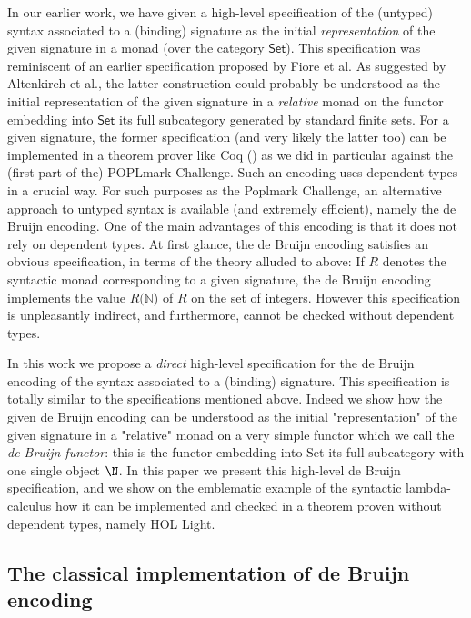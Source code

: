 \documentclass[a4paper,twoside,12pt]{article}
\theoremstyle{definition}
\theoremstyle{remark}
\theoremstyle{example}
\newcommand{\NN}{\mathbb{N}}
\begin{document}
In our earlier work, we have given a high-level specification of the
(untyped) syntax associated to a (binding) signature as the initial
\emph{representation} of the given signature in a monad (over the
category $\mathsf{Set}$). This specification was reminiscent of an
earlier specification proposed by Fiore et al. As suggested by
Altenkirch et al., the latter construction could probably be
understood as the initial representation of the given signature in a
\emph{relative} monad on the functor embedding into $\mathsf{Set}$ its
full subcategory generated by standard finite sets.  For a given
signature, the former specification (and very likely the latter too)
can be implemented in a theorem prover like Coq (\cite {todo}) as we
did in particular against the (first part of the) POPLmark Challenge.
Such an encoding uses dependent types in a crucial way.  For such
purposes as the Poplmark Challenge, an alternative approach to untyped
syntax is available (and extremely efficient), namely the de Bruijn
encoding.  One of the main advantages of this encoding is that it does
not rely on dependent types.  At first glance, the de Bruijn encoding
satisfies an obvious specification, in terms of the theory alluded to
above: If $R$ denotes the syntactic monad corresponding to a given
signature, the de Bruijn encoding implements the value $R(\NN$) of $R$
on the set of integers. However this specification is unpleasantly
indirect, and furthermore, cannot be checked without dependent types.

In this work we propose a \emph{direct} high-level specification for
the de Bruijn encoding of the syntax associated to a (binding)
signature. This specification is totally similar to the specifications
mentioned above. Indeed we show how the given de Bruijn encoding can
be understood as the initial "representation" of the given signature
in a "relative" monad on a very simple functor which we call the
\emph{de Bruijn functor}: this is the functor embedding into Set its
full subcategory with one single object $\N$.  In this paper we
present this high-level de Bruijn specification, and we show on the
emblematic example of the syntactic lambda-calculus how it can be
implemented and checked in a theorem proven without dependent types,
namely HOL Light.

\subsection{The classical implementation of de Bruijn encoding}
\label{sec:classical-de-bruijn}
\end{document}
